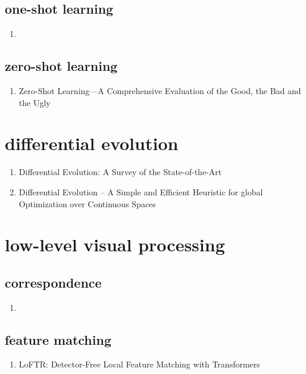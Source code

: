 \documentclass[acmlarge]{acmart}
\begin{document}
	\subsection{one-shot learning}
	\begin{enumerate}
		\item
	\end{enumerate}
	\subsection{zero-shot learning}
	\begin{enumerate}
		\item Zero-Shot Learning—A Comprehensive Evaluation of the Good, the Bad and the Ugly \cite{Xian2019ZeroShotLC} 

	\end{enumerate}
\begin{enumerate}
\end{enumerate}
\section{differential evolution}
\begin{enumerate}
	\item Differential Evolution: A Survey of the State-of-the-Art \cite{Das2011DifferentialEA} 

	\item Differential Evolution – A Simple and Efficient Heuristic for global Optimization over Continuous Spaces \cite{Storn1997DifferentialE} 

\end{enumerate}
\section{low-level visual processing}
	\subsection{correspondence}
	\begin{enumerate}
		\item
	\end{enumerate}
	\subsection{feature matching}
	\begin{enumerate}
		\item LoFTR: Detector-Free Local Feature Matching with Transformers \cite{Sun2021LoFTRDL} 

	\end{enumerate}
\end{document}

